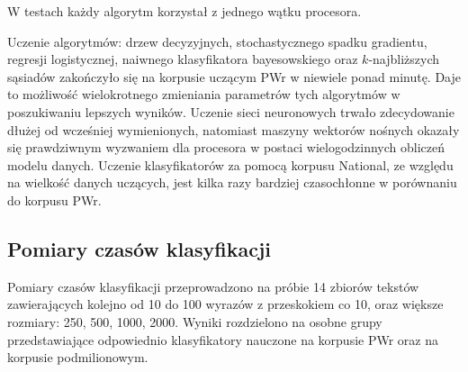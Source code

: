 W testach każdy algorytm korzystał z jednego wątku procesora.

Uczenie algorytmów: drzew decyzyjnych, stochastycznego spadku gradientu, regresji logistycznej, naiwnego klasyfikatora bayesowskiego oraz $k$-najbliższych sąsiadów zakończyło się na korpusie uczącym PWr w niewiele ponad minutę. Daje to możliwość wielokrotnego zmieniania parametrów tych algorytmów w poszukiwaniu lepszych wyników. Uczenie sieci neuronowych trwało zdecydowanie dłużej od wcześniej wymienionych, natomiast maszyny wektorów nośnych okazały się prawdziwnym wyzwaniem dla procesora w postaci wielogodzinnych obliczeń modelu danych. Uczenie klasyfikatorów za pomocą korpusu National, ze względu na wielkość danych uczących, jest kilka razy bardziej czasochłonne w porównaniu do korpusu PWr.

\newpage
\subsection{Pomiary czasów klasyfikacji}

Pomiary czasów klasyfikacji przeprowadzono na próbie 14 zbiorów tekstów zawierających kolejno od 10 do 100 wyrazów z przeskokiem co 10, oraz większe rozmiary: 250, 500, 1000, 2000. Wyniki rozdzielono na osobne grupy przedstawiające odpowiednio klasyfikatory nauczone na korpusie PWr oraz na korpusie podmilionowym.

